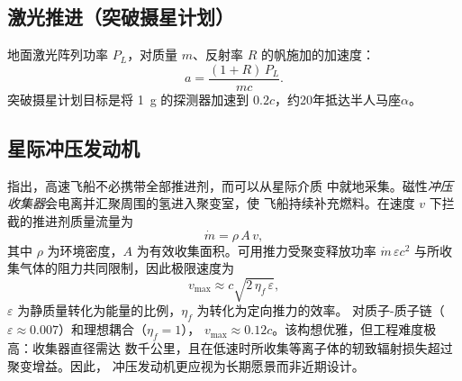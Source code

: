 \documentclass[12pt,a4paper]{article}
\begin{document}
\subsection{激光推进（突破摄星计划）}

地面激光阵列功率 $P_L$，对质量 $m$、反射率 $R$ 的帆施加的加速度：
\begin{equation}
  a = \frac{(1+R)\,P_L}{mc}.
\end{equation}
突破摄星计划目标是将 \SI{1}{\gram} 的探测器加速到 $0.2c$，约20年抵达半人马座$\alpha$。

\subsection{星际冲压发动机}

\citet{Bussard1960} 指出，高速飞船不必携带全部推进剂，而可以从星际介质
中就地采集。磁性\emph{冲压收集器}会电离并汇聚周围的氢进入聚变室，使
飞船持续补充燃料。在速度 $v$ 下拦截的推进剂质量流量为
\begin{equation}
  \dot m = \rho\,A\,v,
  \label{eq:ram_flux_zh}
\end{equation}
其中 $\rho$ 为环境密度，$A$ 为有效收集面积。可用推力受聚变释放功率
$\dot m\,\varepsilon c^2$ 与所收集气体的阻力共同限制，因此极限速度为
\begin{equation}
  v_{\max} \approx c\sqrt{2\,\eta_f\,\varepsilon},
  \label{eq:ram_vmax_zh}
\end{equation}
$\varepsilon$ 为静质量转化为能量的比例，$\eta_f$ 为转化为定向推力的效率。
对质子-质子链（$\varepsilon \approx 0.007$）和理想耦合（$\eta_f = 1$），
$v_{\max} \approx 0.12c$。该构想优雅，但工程难度极高：收集器直径需达
数千公里，且在低速时所收集等离子体的轫致辐射损失超过聚变增益。因此，
冲压发动机更应视为长期愿景而非近期设计。
\end{document}
